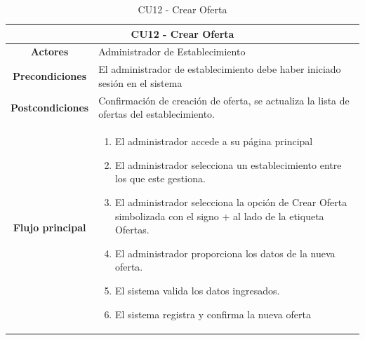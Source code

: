 \begin{table}[h]
    \centering
    \begin{tabular}{|c|p{10cm}|}
        \hline
        \multicolumn{2}{|c|}{\textbf{CU12 - Crear Oferta}}                                                                                               \\
        \hline
        \textbf{Actores}         & Administrador de Establecimiento                                                                                      \\
        \hline
        \textbf{Precondiciones}  & El administrador de establecimiento debe haber iniciado sesión en el sistema                                          \\
        \hline
        \textbf{Postcondiciones} & Confirmación de creación de oferta, se actualiza la lista de ofertas del establecimiento.                             \\
        \hline
        \textbf{Flujo principal} & \begin{enumerate}
                                       \item El administrador accede a su página principal
                                       \item El administrador selecciona un establecimiento entre los que este gestiona.
                                       \item El administrador selecciona la opción de Crear Oferta simbolizada con el signo + al lado de la etiqueta Ofertas.
                                       \item El administrador proporciona los datos de la nueva oferta.
                                       \item El sistema valida los datos ingresados.
                                       \item El sistema registra y confirma la nueva oferta
                                   \end{enumerate} \\
        \hline
    \end{tabular}
    \caption{CU12 - Crear Oferta }
\end{table}

